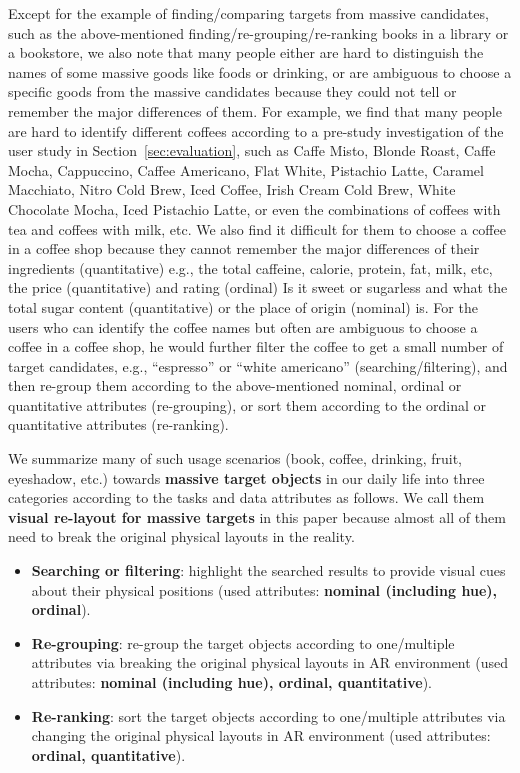 Except for the example of finding/comparing targets from massive candidates, such as the above-mentioned
finding/re-grouping/re-ranking books in a library or a bookstore,
we also note that many people either are hard to distinguish the names of some massive goods like foods or drinking,
or are ambiguous to choose a specific goods from the massive candidates because they
could not tell or remember the major differences of them.
For example, we find that many people are hard to identify different coffees
according to a pre-study investigation of the user study in Section~\ref{sec:evaluation},
such as Caffe Misto, Blonde Roast, Caffe Mocha, Cappuccino, Caffee Americano, Flat White, Pistachio Latte,
Caramel Macchiato, Nitro Cold Brew, Iced Coffee, Irish Cream Cold Brew, White Chocolate Mocha, Iced Pistachio Latte,
or even the combinations of coffees with tea and coffees with milk, etc.
We also find it difficult for them to choose a coffee in a coffee shop
because they cannot remember the major differences of their ingredients (quantitative)
e.g., the total caffeine, calorie, protein, fat, milk, etc,
the price (quantitative) and rating (ordinal)
Is it sweet or sugarless and what the total sugar content (quantitative) or
the place of origin (nominal) is.
For the users who can identify the coffee names but often are ambiguous to
choose a coffee in a coffee shop,
he would further filter the coffee to get a small number of target candidates,
e.g., ``espresso'' or ``white americano'' (searching/filtering),
and then re-group them according to the above-mentioned
nominal, ordinal or quantitative attributes (re-grouping),
or sort them according to the ordinal or quantitative attributes (re-ranking).

We summarize many of such usage scenarios (book, coffee, drinking, fruit, eyeshadow, etc.)
towards \textbf{massive target objects}
in our daily life into three categories according to the tasks and data attributes as follows.
We call them \textbf{visual re-layout for massive targets} in this paper because almost all of them
need to break the original physical layouts in the reality.

\begin{itemize}
\item \textbf{Searching or filtering}: highlight the searched results to provide visual cues
about their physical positions (used attributes: \textbf{nominal (including hue), ordinal}).
\item \textbf{Re-grouping}: re-group the target objects according to one/multiple attributes via breaking the original physical
layouts in AR environment (used attributes: \textbf{nominal (including hue), ordinal, quantitative}).
\item \textbf{Re-ranking}: sort the target objects according to one/multiple attributes via changing the original physical
layouts in AR environment (used attributes: \textbf{ordinal, quantitative}).
\end{itemize}


